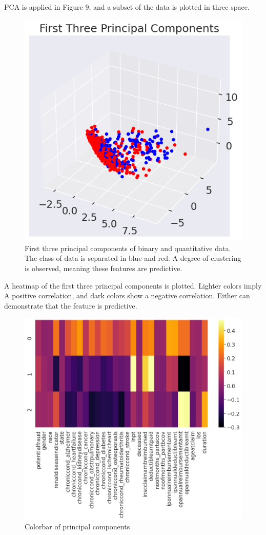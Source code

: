 \documentclass[twoside,11pt]{article}
\begin{document}
PCA is applied in Figure 9,
and a subset of the data is plotted in three space.
\begin{figure}[!htbph]
  \centering
  \includegraphics[width=12cm]{./img/pca.png}
  \caption{First three principal components of binary and quantitative data.
  The class of data is separated in blue and red. A degree of clustering
  is observed, meaning these features are predictive.}
\end{figure}
\newpage
A heatmap of the first three principal components is plotted.  Lighter colors imply A
positive correlation, and dark colors show a negative correlation. Either can 
demonstrate that the feature is predictive.
\begin{figure}[!htbp]
  \centering
  \includegraphics[width=\textwidth]{./img/pca2.png}
  \caption{Colorbar of principal components}
\end{figure}
\newpage
\end{document}
